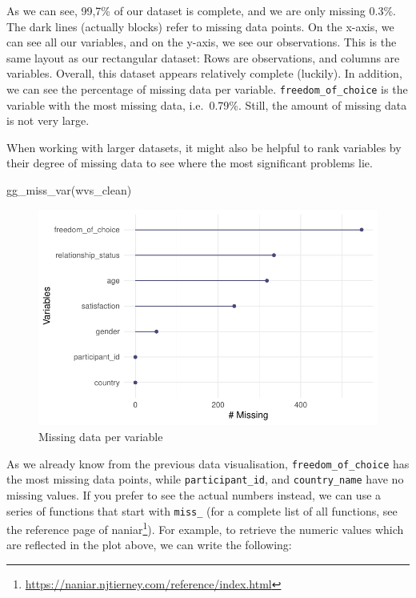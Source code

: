 \documentclass[
  letterpaper,
]{krantz}
\makeatletter
\newenvironment{Shaded}{\begin{snugshade}}{\end{snugshade}}
\newcommand{\FunctionTok}[1]{\textcolor[rgb]{0.28,0.35,0.67}{#1}}
\newcommand{\NormalTok}[1]{\textcolor[rgb]{0.00,0.23,0.31}{#1}}
\renewcommand{\href}[2]{#2\footnote{\url{#1}}}
\newenvironment{kframe}{%
\medskip{}
\setlength{\fboxsep}{.8em}
 \def\at@end@of@kframe{}%
 \ifinner\ifhmode%
  \def\at@end@of@kframe{\end{minipage}}%
  \begin{minipage}{\columnwidth}%
 \fi\fi%
 \def\FrameCommand##1{\hskip\@totalleftmargin \hskip-\fboxsep
 \colorbox{shadecolor}{##1}\hskip-\fboxsep
     \hskip-\linewidth \hskip-\@totalleftmargin \hskip\columnwidth}%
 \MakeFramed {\advance\hsize-\width
   \@totalleftmargin\z@ \linewidth\hsize
   \@setminipage}}%
 {\par\unskip\endMakeFramed%
 \at@end@of@kframe}
\renewenvironment{Shaded}{\begin{kframe}}{\end{kframe}}
\makeatother
\begin{document}
As we can see, 99,7\% of our dataset is complete, and we are only
missing 0.3\%. The dark lines (actually blocks) refer to missing data
points. On the x-axis, we can see all our variables, and on the y-axis,
we see our observations. This is the same layout as our rectangular
dataset: Rows are observations, and columns are variables. Overall, this
dataset appears relatively complete (luckily). In addition, we can see
the percentage of missing data per variable.
\texttt{freedom\_of\_choice} is the variable with the most missing data,
i.e.~0.79\%. Still, the amount of missing data is not very large.

When working with larger datasets, it might also be helpful to rank
variables by their degree of missing data to see where the most
significant problems lie.

\begin{Shaded}
\begin{Highlighting}[]
\FunctionTok{gg\_miss\_var}\NormalTok{(wvs\_clean)}
\end{Highlighting}
\end{Shaded}

\begin{figure}[H]

{\centering \includegraphics{07_data_wrangling_files/figure-pdf/missing-data-per-variable-1.pdf}

}

\caption{Missing data per variable}

\end{figure}%

As we already know from the previous data visualisation,
\texttt{freedom\_of\_choice} has the most missing data points, while
\texttt{participant\_id}, and \texttt{country\_name} have no missing
values. If you prefer to see the actual numbers instead, we can use a
series of functions that start with \texttt{miss\_} (for a complete list
of all functions, see the
\href{https://naniar.njtierney.com/reference/index.html}{reference page
of naniar}). For example, to retrieve the numeric values which are
reflected in the plot above, we can write the following:
\end{document}
